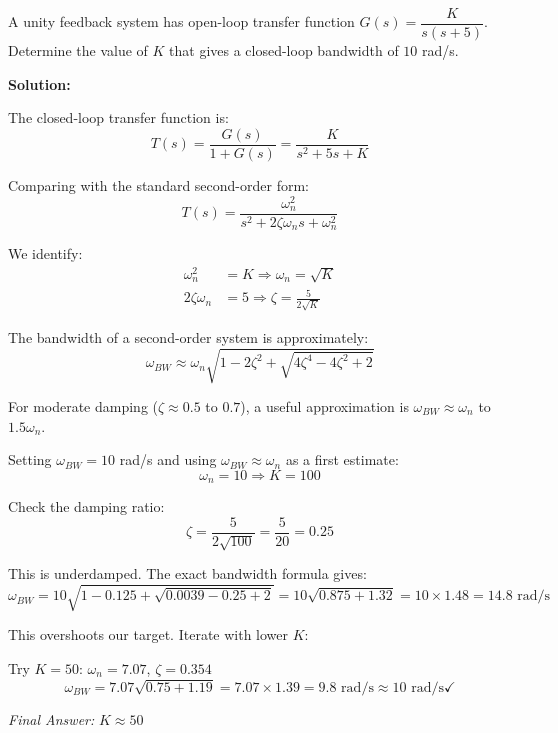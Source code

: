 \begin{example}
\label{ex:bandwidth}
A unity feedback system has open-loop transfer function $G(s) = \dfrac{K}{s(s+5)}$. Determine the value of $K$ that gives a closed-loop bandwidth of $10$ rad/s.

\textbf{Solution:}

The closed-loop transfer function is:
\begin{equation}
T(s) = \frac{G(s)}{1+G(s)} = \frac{K}{s^2 + 5s + K}
\end{equation}

Comparing with the standard second-order form:
\begin{equation}
T(s) = \frac{\omega_n^2}{s^2 + 2\zeta\omega_n s + \omega_n^2}
\end{equation}

We identify:
\begin{align}
\omega_n^2 &= K \Rightarrow \omega_n = \sqrt{K} \\
2\zeta\omega_n &= 5 \Rightarrow \zeta = \frac{5}{2\sqrt{K}}
\end{align}

The bandwidth of a second-order system is approximately:
\begin{equation}
\omega_{BW} \approx \omega_n\sqrt{1 - 2\zeta^2 + \sqrt{4\zeta^4 - 4\zeta^2 + 2}}
\end{equation}

For moderate damping ($\zeta \approx 0.5$ to $0.7$), a useful approximation is $\omega_{BW} \approx \omega_n$ to $1.5\omega_n$.

Setting $\omega_{BW} = 10$ rad/s and using $\omega_{BW} \approx \omega_n$ as a first estimate:
\begin{equation}
\omega_n = 10 \Rightarrow K = 100
\end{equation}

Check the damping ratio:
\begin{equation}
\zeta = \frac{5}{2\sqrt{100}} = \frac{5}{20} = 0.25
\end{equation}

This is underdamped. The exact bandwidth formula gives:
\begin{equation}
\omega_{BW} = 10\sqrt{1 - 0.125 + \sqrt{0.0039 - 0.25 + 2}} = 10\sqrt{0.875 + 1.32} = 10 \times 1.48 = 14.8 \text{ rad/s}
\end{equation}

This overshoots our target. Iterate with lower $K$:

Try $K = 50$: $\omega_n = 7.07$, $\zeta = 0.354$
\begin{equation}
\omega_{BW} = 7.07\sqrt{0.75 + 1.19} = 7.07 \times 1.39 = 9.8 \text{ rad/s} \approx 10 \text{ rad/s} \checkmark
\end{equation}

\textit{Final Answer:} $\boxed{K \approx 50}$
\end{example}

